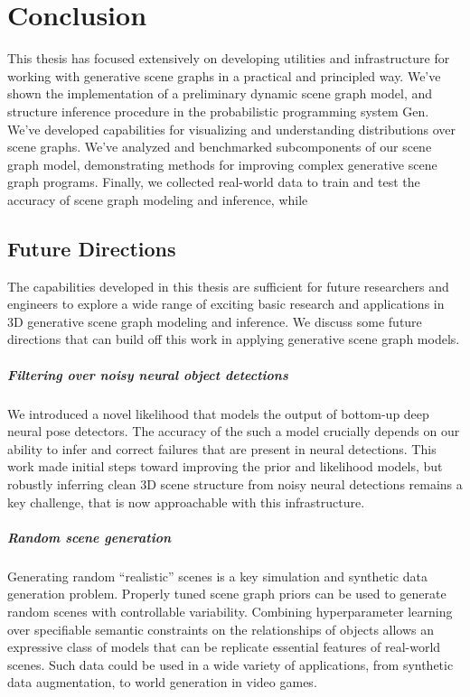 \chapter{Conclusion}
This thesis has focused extensively on developing utilities and infrastructure for working with generative scene graphs in a practical and principled way.
We've shown the implementation of a preliminary dynamic scene graph model, and structure inference procedure in the probabilistic programming system Gen.
We've developed capabilities for visualizing and understanding distributions over scene graphs.
We've analyzed and benchmarked subcomponents of our scene graph model, demonstrating methods for improving complex generative scene graph programs.
Finally, we collected real-world data to train and test the accuracy of scene graph modeling and inference, while 

\section{Future Directions}
The capabilities developed in this thesis are sufficient for future researchers and engineers to explore a wide range of exciting basic research and applications in 3D generative scene graph modeling and inference.
We discuss some future directions that can build off this work in applying generative scene graph models.

\paragraph{Filtering over noisy neural object detections}
We introduced a novel likelihood that models the output of bottom-up deep neural pose detectors.
The accuracy of the such a model crucially depends on our ability to infer and correct failures that are present in neural detections.
This work made initial steps toward improving the prior and likelihood models, but robustly inferring clean 3D scene structure from noisy neural detections remains a key challenge, that is now approachable with this infrastructure.

\paragraph{Random scene generation}
Generating random ``realistic'' scenes is a key simulation and synthetic data generation problem.
Properly tuned scene graph priors can be used to generate random scenes with controllable variability.
Combining hyperparameter learning over specifiable semantic constraints on the relationships of objects allows an expressive class of models that can be replicate essential features of real-world scenes.
Such data could be used in a wide variety of applications, from synthetic data augmentation, to world generation in video games.

